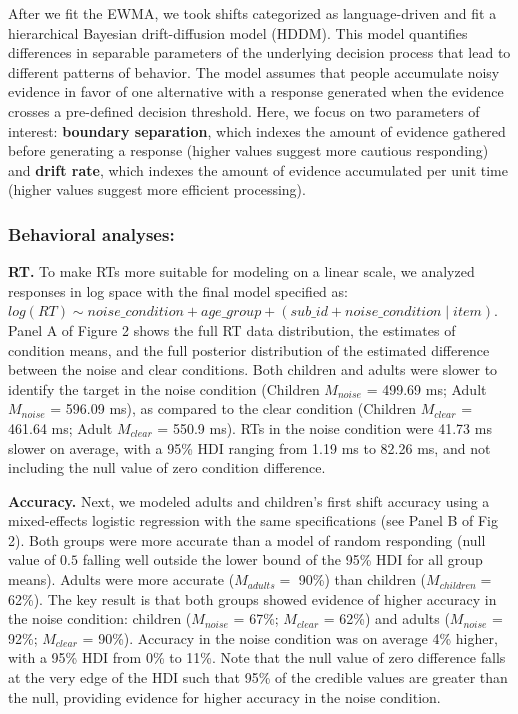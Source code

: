\documentclass[10pt, letterpaper]{article}
\begin{document}
After we fit the EWMA, we took shifts categorized as language-driven and
fit a hierarchical Bayesian drift-diffusion model (HDDM). This model
quantifies differences in separable parameters of the underlying
decision process that lead to different patterns of behavior. The model
assumes that people accumulate noisy evidence in favor of one
alternative with a response generated when the evidence crosses a
pre-defined decision threshold. Here, we focus on two parameters of
interest: \textbf{boundary separation}, which indexes the amount of
evidence gathered before generating a response (higher values suggest
more cautious responding) and \textbf{drift rate}, which indexes the
amount of evidence accumulated per unit time (higher values suggest more
efficient processing).

\subsubsection{Behavioral analyses:}\label{behavioral-analyses}

\textbf{RT.} To make RTs more suitable for modeling on a linear scale,
we analyzed responses in log space with the final model specified as:
\texttt{$log(RT) \sim noise\_condition + age\_group + (sub\_id + noise\_condition \mid item)$}.
Panel A of Figure 2 shows the full RT data distribution, the estimates
of condition means, and the full posterior distribution of the estimated
difference between the noise and clear conditions. Both children and
adults were slower to identify the target in the noise condition
(Children \(M_{noise}\) = 499.69 ms; Adult \(M_{noise}\) = 596.09 ms),
as compared to the clear condition (Children \(M_{clear}\) = 461.64 ms;
Adult \(M_{clear}\) = 550.9 ms). RTs in the noise condition were 41.73
ms slower on average, with a 95\% HDI ranging from 1.19 ms to 82.26 ms,
and not including the null value of zero condition difference.

\textbf{Accuracy.} Next, we modeled adults and children's first shift
accuracy using a mixed-effects logistic regression with the same
specifications (see Panel B of Fig 2). Both groups were more accurate
than a model of random responding (null value of \(0.5\) falling well
outside the lower bound of the 95\% HDI for all group means). Adults
were more accurate (\(M_{adults} =\) 90\%) than children
(\(M_{children} =\) 62\%). The key result is that both groups showed
evidence of higher accuracy in the noise condition: children
(\(M_{noise}\) = 67\%; \(M_{clear}\) = 62\%) and adults (\(M_{noise}\) =
92\%; \(M_{clear}\) = 90\%). Accuracy in the noise condition was on
average 4\% higher, with a 95\% HDI from 0\% to 11\%. Note that the null
value of zero difference falls at the very edge of the HDI such that
95\% of the credible values are greater than the null, providing
evidence for higher accuracy in the noise condition.
\end{document}
